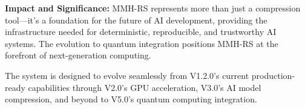 \documentclass[12pt,a4paper]{article}
\begin{document}
\textbf{Impact and Significance:}
MMH-RS represents more than just a compression tool—it's a foundation for the future of AI development, providing the infrastructure needed for deterministic, reproducible, and trustworthy AI systems. The evolution to quantum integration positions MMH-RS at the forefront of next-generation computing.

The system is designed to evolve seamlessly from V1.2.0's current production-ready capabilities through V2.0's GPU acceleration, V3.0's AI model compression, and beyond to V5.0's quantum computing integration.
\end{document}
